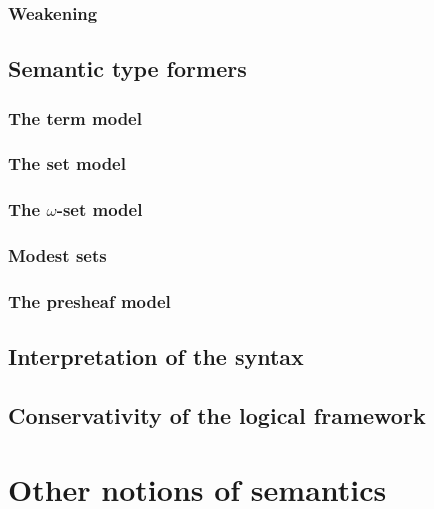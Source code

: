 \documentclass[a4paper]{article}
\begin{document}
\subsubsection{Weakening}\label{sec:w}
\subsection{Semantic type formers}\label{sec:stf}
\subsubsection{The term model}\label{sec:ttm}
\subsubsection{The set model}\label{sec:tsm}
\subsubsection{The $\omega$-set model}\label{sec:twsm}
\subsubsection{Modest sets}\label{sec:ms}
\subsubsection{The presheaf model}\label{sec:tpm}
\subsection{Interpretation of the syntax}\label{sec:iots}
\subsection{Conservativity of the logical framework}\label{sec:cotlf}
\section{Other notions of semantics}\label{sec:onos}



\end{document}
